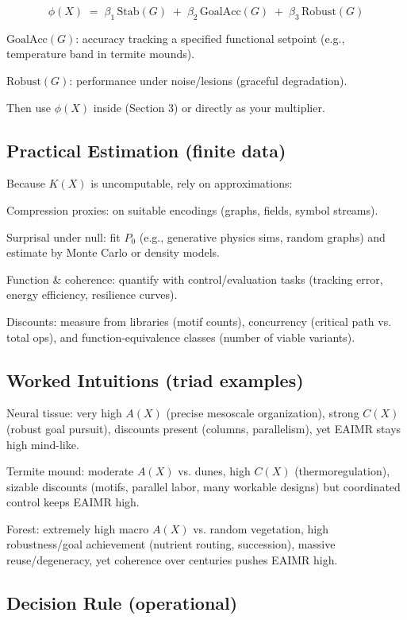 \documentclass{article}
\begin{document}
\[\phi(X) \;=\; \beta_1\, \text{Stab}(G) \;+\; \beta_2\, \text{GoalAcc}(G) \;+\; \beta_3\, \text{Robust}(G)\]

\(\text{GoalAcc}(G)\): accuracy tracking a specified functional setpoint (e.g., temperature band in termite mounds).

\(\text{Robust}(G)\): performance under noise/lesions (graceful degradation).

Then use \(\phi(X)\) inside (Section 3) or directly as your multiplier.

\subsection{Practical Estimation (finite data)}

Because \(K(X)\) is uncomputable, rely on approximations:

Compression proxies: on suitable encodings (graphs, fields, symbol streams).

Surprisal under null: fit \(P_0\) (e.g., generative physics sims, random graphs) and estimate by Monte Carlo or density models.

Function \& coherence: quantify with control/evaluation tasks (tracking error, energy efficiency, resilience curves).

Discounts: measure from libraries (motif counts), concurrency (critical path vs. total ops), and function-equivalence classes (number of viable variants).

\subsection{Worked Intuitions (triad examples)}

Neural tissue: very high \(A(X)\) (precise mesoscale organization), strong \(C(X)\) (robust goal pursuit), discounts present (columns, parallelism), yet EAIMR stays high mind-like.

Termite mound: moderate \(A(X)\) vs. dunes, high \(C(X)\) (thermoregulation), sizable discounts (motifs, parallel labor, many workable designs) but coordinated control keeps EAIMR high.

Forest: extremely high macro \(A(X)\) vs. random vegetation, high robustness/goal achievement (nutrient routing, succession), massive reuse/degeneracy, yet coherence over centuries pushes EAIMR high.

\subsection{Decision Rule (operational)}
\end{document}
